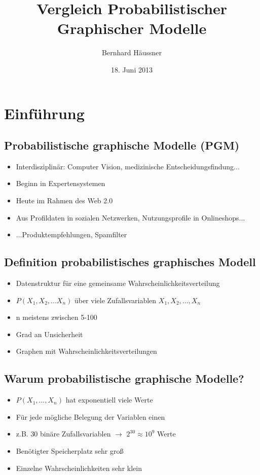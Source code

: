 \documentclass[a5paper,16pt,oneside,landscape]{scrartcl}
\title{Vergleich Probabilistischer Graphischer Modelle}
\author{Bernhard Häussner}
\date{18. Juni 2013}
\begin{document}
 
 
\section{Einführung}


  \subsection*{Probabilistische graphische Modelle (PGM)}
  \begin{itemize}
    \item Interdisziplinär: Computer Vision, medizinische Entscheidungsfindung...
    \item Beginn in Expertensystemen
    \item Heute im Rahmen des Web 2.0
    \item Aus Profildaten in sozialen Netzwerken, Nutzungsprofile in Onlineshops...
    \item ...Produktempfehlungen, Spamfilter
  \end{itemize}



  \subsection*{Definition probabilistisches graphisches Modell}
  \begin{itemize}
    \item Datenstruktur für eine gemeinsame Wahrscheinlichkeitsverteilung
    \item $P(X_1, X_2, ... X_n)$ über viele Zufallsvariablen $X_1,X_2,\dots,X_n$ 
    \item n meistens zwischen 5-100
    \item Grad an Unsicherheit 
    \item Graphen mit Wahrscheinlichkeitsverteilungen
  \end{itemize}



  \subsection*{Warum probabilistische graphische Modelle?}
  \begin{itemize}
    \item $P(X_1, ..., X_n)$ hat exponentiell viele Werte
    \item Für jede mögliche Belegung der Variablen einen
    \item z.B. $30$ binäre Zufallsvariablen $\rightarrow$ $2^{30} \approx 10^9 $ Werte
    \item Benötigter Speicherplatz sehr groß
    \item Einzelne Wahrscheinlichkeiten sehr klein
  \end{itemize}
\end{document}
